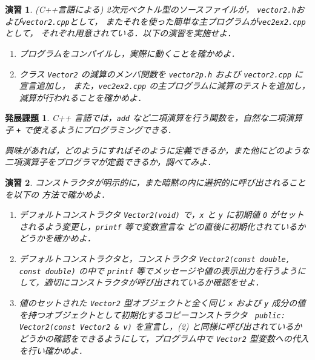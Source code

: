 \documentclass[11pt,a4,epsf]{jarticle}
\newtheorem{exerc}{演習}
\newtheorem{adv}{発展課題}
\begin{document}
\begin{exerc} %
(C++言語による) 2次元ベクトル型のソースファイルが，
\verb+vector2.h+および\verb+vector2.cpp+として，
またそれを使った簡単な主プログラムが\verb+vec2ex2.cpp+として，
それぞれ用意されている．以下の演習を実施せよ．

\begin{enumerate}

\item[(1)] プログラムをコンパイルし，実際に動くことを確かめよ．

\item[(2)] クラス \verb+Vector2+ の減算のメンバ関数を
\verb+vector2p.h+ および \verb+vector2.cpp+ に宣言追加し，
また，\verb+vec2ex2.cpp+ の主プログラムに減算のテストを追加し，
減算が行われることを確かめよ．


\end{enumerate}
\end{exerc} %

\begin{adv}
C++ 言語では，\verb+add+ など二項演算を行う関数を，自然な二項演算子 \verb=+= で使えるようにプログラミングできる．

興味があれば，どのようにすればそのように定義できるか，また他にどのような二項演算子をプログラマが定義できるか，調べてみよ．
\end{adv}

\begin{exerc} %
コンストラクタが明示的に，また暗黙の内に選択的に呼び出されることを以下の
方法で確かめよ．
\begin{enumerate}
\item[(1)] 
デフォルトコンストラクタ \verb+Vector2(void)+ で，\verb+x+ と \verb+y+
に初期値 \verb+0+ がセットされるよう変更し，\verb+printf+ 等で変数宣言な
	   どの直後に初期化されているかどうかを確かめよ．
\item[(2)] 
デフォルトコンストラクタと，コンストラクタ
\verb+Vector2(const double, const double)+ の中で \verb+printf+ 等でメッセージや値の表示出力を行うようにして，適切にコンストラクタが呼び出されているか確認をせよ．
\item[(3)]
値のセットされた \verb+Vector2+ 型オブジェクトと全く同じ \verb+x+ および
\verb+y+ 成分の値を持つオブジェクトとして初期化するコピーコンストラクタ 
\verb/ public: Vector2(const Vector2 & v)/ 
を宣言し，(2) と同様に呼び出されているかどうかの確認をできるようにして，プログラム中で
\verb+Vector2+ 型変数への代入を行い確かめよ．
\end{enumerate}

\end{exerc} %
\end{document}
